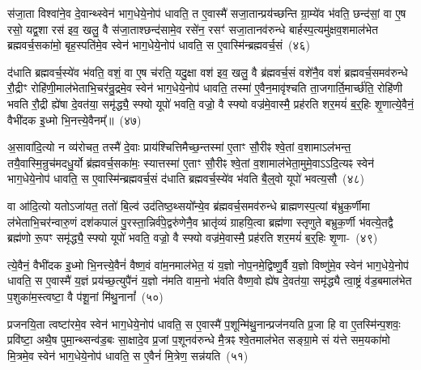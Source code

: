 स॑जा॒ता विश्वा॑ने॒व दे॒वान्थ्स्वेन॑ भाग॒\-धेये॒नोप॑ धावति॒ त ए॒वास्मै॑ सजा॒तान्प्रय॑च्छन्ति ग्रा॒म्ये॑व भ॑वति॒ छन्द॑सां॒ वा ए॒ष रसो॒ यद्व॒शा रस॑ इव॒ खलु॒ वै स॑जा॒ताश्छन्द॑सामे॒व रसे॑न॒ रसꣳ॑ सजा॒तानव॑\-रुन्धे बार्\mbox{}हस्प॒त्यमु॑क्षव॒शमाल॑भेत ब्रह्मवर्च॒सका॑मो॒ बृह॒स्पति॑मे॒व स्वेन॑ भाग॒\-धेये॒नोप॑ धावति॒ स ए॒वास्मि॑न्ब्रह्मवर्च॒सं~(४६)\ip

द॑धाति ब्रह्मवर्च॒स्ये॑व भ॑वति॒ वशं॒ वा ए॒ष च॑रति॒ यदु॒क्षा वश॑ इव॒ खलु॒ वै ब्र॑ह्मवर्च॒सं वशे॑नै॒व वशं॑ ब्रह्मवर्च॒समव॑\-रुन्धे रौ॒द्रीꣳ रोहि॑णी॒माल॑भेताभि॒चर॑न्रु॒द्रमे॒व स्वेन॑ भाग॒\-धेये॒नोप॑ धावति॒ तस्मा॑ ए॒वैन॒मावृ॑श्चति ता॒जगार्ति॒मार्च्छ॑ति॒ रोहि॑णी भवति रौ॒द्री ह्ये॑षा दे॒वत॑या॒ समृ॑द्ध्यै॒ स्फ्यो यूपो॑ भवति॒ वज्रो॒ वै स्फ्यो वज्र॑मे॒वास्मै॒ प्रह॑रति शर॒मयं॑ ब॒र्॒\mbox{}हिः शृ॒णात्ये॒वैनं॒ वैभी॑दक इ॒ध्मो भि॒नत्त्ये॒वैनम्᳚॥~(४७)\ip

{\anuvakamend[{अ॒भि खलु॒ वृष्टि॒श्छन्द॑सामे॒व रसे॑न प्र॒जामव॑ वैश्वदे॒वा वै ब्र॑ह्मवर्च॒सं यूप॒ एका॒न्नविꣳ॑श॒तिश्च॑।}]}

अ॒सावा॑दि॒त्यो न व्य॑रोचत॒ तस्मै॑ दे॒वाः प्राय॑श्चित्ति\-मैच्छ॒न्तस्मा॑ ए॒ताꣳ सौ॒रीꣴ श्वे॒तां व॒शामा\-ऽल॑भन्त॒ तयै॒वास्मि॒न्रुच॑मदधु॒र्यो ब्र॑ह्मवर्च॒सका॑मः॒ स्यात्तस्मा॑ ए॒ताꣳ सौ॒रीꣴ श्वे॒तां व॒शामाल॑भेता॒मुमे॒\-वा\-ऽऽ\-\-दि॒त्यꣴ स्वेन॑ भाग॒\-धेये॒नोप॑ धावति॒ स ए॒वास्मि॑न्ब्रह्मवर्च॒सं द॑धाति ब्रह्मवर्च॒स्ये॑व भ॑वति बै॒ल्॒\mbox{}वो यूपो॑ भवत्य॒सौ~(४८)\ip

वा आ॑दि॒त्यो यतो\-ऽजा॑यत॒ ततो॑ बि॒ल्व॑ उद॑तिष्ठ॒थ्सयो᳚न्ये॒व ब्र॑ह्मवर्च॒समव॑\-रुन्धे ब्राह्मणस्प॒त्यां ब॑भ्रुक॒र्णीमा ल॑भेताभि॒\-चर॑न्वारु॒णं दश॑\-कपालं पु॒रस्ता॒न्निर्व॑पे॒द्वरु॑णेनै॒व भ्रातृ॑व्यं ग्राहयि॒त्वा ब्रह्म॑णा स्तृणुते बभ्रुक॒र्णी भ॑वत्ये॒तद्वै ब्रह्म॑णो रू॒पꣳ समृ॑द्ध्यै॒ स्फ्यो यूपो॑ भवति॒ वज्रो॒ वै स्फ्यो वज्र॑मे॒वास्मै॒ प्रह॑रति शर॒मयं॑ ब॒र्॒\mbox{}हिः शृ॒णा-~(४९)\ip

त्ये॒वैनं॒ वैभी॑दक इ॒ध्मो भि॒नत्त्ये॒वैनं॑ वैष्ण॒वं वा॑म॒नमा\-ल॑भेत॒ यं य॒ज्ञो नोप॒नमे॒द्विष्णु॒र्वै य॒ज्ञो विष्णु॑मे॒व स्वेन॑ भाग॒\-धेये॒नोप॑ धावति॒ स ए॒वास्मै॑ य॒ज्ञं प्रय॑च्छ॒त्युपै॑नं य॒ज्ञो न॑मति वाम॒नो भ॑वति वैष्ण॒वो ह्ये॑ष दे॒वत॑या॒ समृ॑द्ध्यै त्वा॒ष्ट्रं व॑ड॒बमाल॑भेत प॒शुका॑म॒स्त्वष्टा॒ वै प॑शू॒नां मि॑थु॒नानां᳚~(५०)\ip

प्रजनयि॒ता त्वष्टा॑रमे॒व स्वेन॑ भाग॒\-धेये॒नोप॑ धावति॒ स ए॒वास्मै॑ प॒शून्मि॑थु॒नान्प्रज॑नयति प्र॒जा हि वा ए॒तस्मि॑न्प॒शवः॒ प्रवि॑ष्टा॒ अथै॒ष पुमा॒न्थ्सन्व॑ड॒बः सा॒क्षादे॒व प्र॒जां प॒शूनव॑\-रुन्धे मै॒त्रꣴ श्वे॒तमाल॑भेत सङ्ग्रा॒मे सं य॑त्ते सम॒यका॑मो मि॒त्रमे॒व स्वेन॑ भाग॒\-धेये॒नोप॑ धावति॒ स ए॒वैनं॑ मि॒त्रेण॒ सन्न॑यति~(५१)\ip

